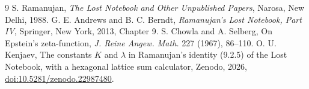 \documentclass[11pt]{article}
\theoremstyle{remark}
\begin{document}
\begin{thebibliography}{9}
 S. Ramanujan, \emph{The Lost Notebook and Other Unpublished Papers}, Narosa, New Delhi, 1988.
 G. E. Andrews and B. C. Berndt, \emph{Ramanujan's Lost Notebook, Part IV}, Springer, New York, 2013, Chapter 9.
 S. Chowla and A. Selberg, On Epstein's zeta-function, \emph{J. Reine Angew. Math.} 227 (1967), 86--110.
 O. U. Kenjaev, The constants $K$ and $\lambda$ in Ramanujan's identity (9.2.5) of the Lost Notebook, with a hexagonal
lattice sum calculator, Zenodo, 2026, \href{https://doi.org/10.5281/zenodo.22987480}{doi:10.5281/zenodo.22987480}.
\end{thebibliography}
\end{document}
